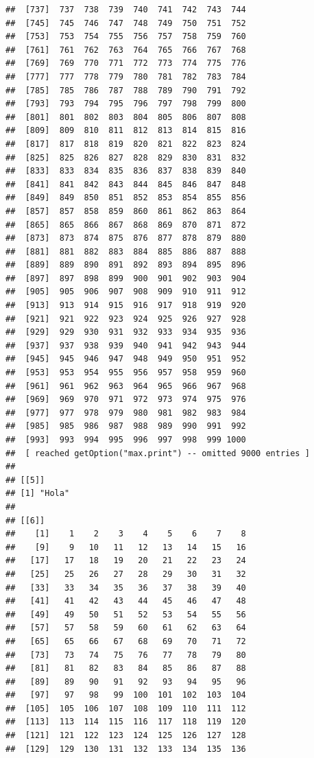 \documentclass[
]{book}
\begin{document}
\begin{verbatim}
##  [737]  737  738  739  740  741  742  743  744
##  [745]  745  746  747  748  749  750  751  752
##  [753]  753  754  755  756  757  758  759  760
##  [761]  761  762  763  764  765  766  767  768
##  [769]  769  770  771  772  773  774  775  776
##  [777]  777  778  779  780  781  782  783  784
##  [785]  785  786  787  788  789  790  791  792
##  [793]  793  794  795  796  797  798  799  800
##  [801]  801  802  803  804  805  806  807  808
##  [809]  809  810  811  812  813  814  815  816
##  [817]  817  818  819  820  821  822  823  824
##  [825]  825  826  827  828  829  830  831  832
##  [833]  833  834  835  836  837  838  839  840
##  [841]  841  842  843  844  845  846  847  848
##  [849]  849  850  851  852  853  854  855  856
##  [857]  857  858  859  860  861  862  863  864
##  [865]  865  866  867  868  869  870  871  872
##  [873]  873  874  875  876  877  878  879  880
##  [881]  881  882  883  884  885  886  887  888
##  [889]  889  890  891  892  893  894  895  896
##  [897]  897  898  899  900  901  902  903  904
##  [905]  905  906  907  908  909  910  911  912
##  [913]  913  914  915  916  917  918  919  920
##  [921]  921  922  923  924  925  926  927  928
##  [929]  929  930  931  932  933  934  935  936
##  [937]  937  938  939  940  941  942  943  944
##  [945]  945  946  947  948  949  950  951  952
##  [953]  953  954  955  956  957  958  959  960
##  [961]  961  962  963  964  965  966  967  968
##  [969]  969  970  971  972  973  974  975  976
##  [977]  977  978  979  980  981  982  983  984
##  [985]  985  986  987  988  989  990  991  992
##  [993]  993  994  995  996  997  998  999 1000
##  [ reached getOption("max.print") -- omitted 9000 entries ]
## 
## [[5]]
## [1] "Hola"
## 
## [[6]]
##    [1]    1    2    3    4    5    6    7    8
##    [9]    9   10   11   12   13   14   15   16
##   [17]   17   18   19   20   21   22   23   24
##   [25]   25   26   27   28   29   30   31   32
##   [33]   33   34   35   36   37   38   39   40
##   [41]   41   42   43   44   45   46   47   48
##   [49]   49   50   51   52   53   54   55   56
##   [57]   57   58   59   60   61   62   63   64
##   [65]   65   66   67   68   69   70   71   72
##   [73]   73   74   75   76   77   78   79   80
##   [81]   81   82   83   84   85   86   87   88
##   [89]   89   90   91   92   93   94   95   96
##   [97]   97   98   99  100  101  102  103  104
##  [105]  105  106  107  108  109  110  111  112
##  [113]  113  114  115  116  117  118  119  120
##  [121]  121  122  123  124  125  126  127  128
##  [129]  129  130  131  132  133  134  135  136

\end{verbatim}
\end{document}
